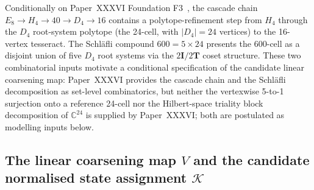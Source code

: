 \documentclass[12pt]{article}
\theoremstyle{definition}
\theoremstyle{remark}
\newcommand{\Kcal}{\mathcal{K}}
\newcommand{\twoI}{2\mathbf{I}}
\newcommand{\twoT}{2\mathbf{T}}
\begin{document}
Conditionally on Paper~XXXVI Foundation F3~\citep{SmartXXXVI}, the cascade chain $E_8 \to H_4 \to 40 \to D_4 \to 16$ contains a polytope-refinement step from $H_4$ through the $D_4$ root-system polytope (the 24-cell, with $|D_4| = 24$ vertices) to the 16-vertex tesseract. The Schl\"afli compound $600 = 5 \times 24$ presents the 600-cell as a disjoint union of five $D_4$ root systems via the $\twoI/\twoT$ coset structure. These two combinatorial inputs motivate a conditional specification of the candidate linear coarsening map: Paper~XXXVI provides the cascade chain and the Schl\"afli decomposition as set-level combinatorics, but neither the vertexwise 5-to-1 surjection onto a reference 24-cell nor the Hilbert-space triality block decomposition of $\mathbb{C}^{24}$ is supplied by Paper~XXXVI; both are postulated as modelling inputs below.

\subsection{The linear coarsening map $V$ and the candidate normalised state assignment $\Kcal$}
\end{document}

